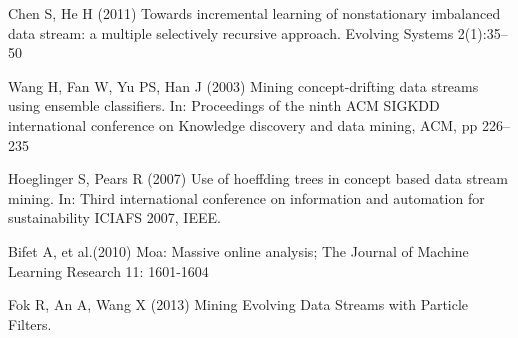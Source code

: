 \documentclass[conference]{IEEEtran}
\begin{document}
\begin{thebibliography}{16}
Chen S, He H (2011) Towards incremental learning of nonstationary imbalanced
  data stream: a multiple selectively recursive approach. Evolving Systems
  2(1):35--50
  
Wang H, Fan W, Yu PS, Han J (2003) Mining concept-drifting data streams using
  ensemble classifiers. In: Proceedings of the ninth ACM SIGKDD international
  conference on Knowledge discovery and data mining, ACM, pp 226--235

Hoeglinger S, Pears R (2007) Use of hoeffding trees in concept based data stream mining. In: Third international conference on information and automation for sustainability ICIAFS 2007, IEEE.
  
 Bifet A, et al.(2010) Moa: Massive online analysis; The Journal of Machine Learning Research 11: 1601-1604
 
 Fok R, An A, Wang X (2013) Mining Evolving Data Streams with Particle Filters.
\end{thebibliography}




\end{document}
